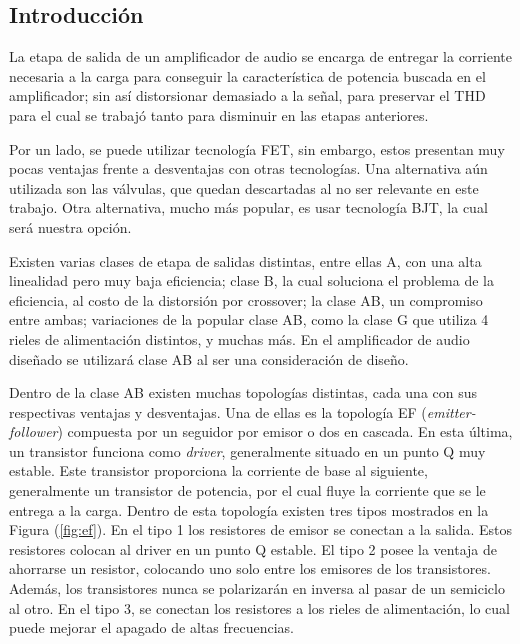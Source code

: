 



\subsection{Introducción}

La etapa de salida de un amplificador de audio se encarga de entregar la corriente necesaria a la carga para conseguir la característica de potencia buscada en el amplificador; sin así distorsionar demasiado a la señal, para preservar el THD para el cual se trabajó tanto para disminuir en las etapas anteriores.

Por un lado, se puede utilizar tecnología FET, sin embargo, estos presentan muy pocas ventajas frente a desventajas con otras tecnologías. Una alternativa aún utilizada son las válvulas, que quedan descartadas al no ser relevante en este trabajo. Otra alternativa, mucho más popular, es usar tecnología BJT, la cual será nuestra opción. 

Existen varias clases de etapa de salidas distintas, entre ellas A, con una alta linealidad pero muy baja eficiencia; clase B, la cual soluciona el problema de la eficiencia, al costo de la distorsión por crossover; la clase AB, un compromiso entre ambas; variaciones de la popular clase AB, como la clase G que utiliza 4 rieles de alimentación distintos, y muchas más.
En el amplificador de audio diseñado se utilizará clase AB al ser una consideración de diseño.

Dentro de la clase AB existen muchas topologías distintas, cada una con sus respectivas ventajas y desventajas. Una de ellas es la topología EF (\textit{emitter-follower}) compuesta por un seguidor por emisor o dos en cascada. En esta última, un transistor funciona como \textit{driver}, generalmente situado en un punto Q muy estable. Este transistor proporciona la corriente de base al siguiente, generalmente un transistor de potencia, por el cual fluye la corriente que se le entrega a la carga. Dentro de esta topología existen tres tipos mostrados en la Figura (\ref{fig:ef}). En el tipo 1 los resistores de emisor se conectan a la salida. Estos resistores colocan al driver en un punto Q estable. El tipo 2 posee la ventaja de ahorrarse un resistor, colocando uno solo entre los emisores de los transistores. Además, los transistores nunca se polarizarán en inversa al pasar de un semiciclo al otro. En el tipo 3, se conectan los resistores a los rieles de alimentación, lo cual puede mejorar el apagado de altas frecuencias.

